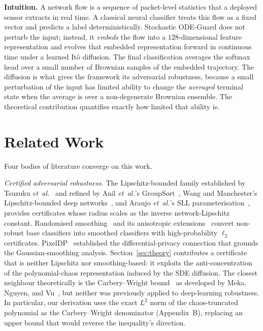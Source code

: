\documentclass{ieeeaccess}
\begin{document}
\medskip\noindent\textbf{Intuition.} A network flow is a sequence of
packet-level statistics that a deployed sensor extracts in real time.
A classical neural classifier treats this flow as a fixed vector and
predicts a label deterministically. Stochastic ODE-Guard does not
perturb the input; instead, it \emph{embeds} the flow into a
$128$-dimensional feature representation and evolves that embedded
representation forward in continuous time under a learned It\^o
diffusion. The final classification averages the softmax head over a
small number of Brownian samples of the embedded trajectory. The
diffusion is what gives the framework its adversarial robustness,
because a small perturbation of the input has limited ability to
change the \emph{averaged} terminal state when the average is over a
non-degenerate Brownian ensemble. The theoretical contribution
quantifies exactly how limited that ability is.

\section{Related Work}\label{sec:related}
Four bodies of literature converge on this work.

\emph{Certified adversarial robustness.} The Lipschitz-bounded family
established by Tsuzuku \textit{et~al.}~\cite{tsuzuku2018lipschitz}
and refined by Anil \textit{et~al.}'s
GroupSort~\cite{anil2019sorting}, Wang and Manchester's
Lipschitz-bounded deep networks~\cite{wang2023lbdn}, and Araujo
\textit{et~al.}'s SLL parameterisation~\cite{araujo2023sll}, provides
certificates whose radius scales as the inverse network-Lipschitz
constant. Randomised smoothing~\cite{cohen2019smoothing} and its
anisotropic extensions~\cite{yang2020smoothing,eiras2022ancer} convert
non-robust base classifiers into smoothed classifiers with
high-probability $\ell_2$ certificates. PixelDP~\cite{lecuyer2019pixeldp}
established the differential-privacy connection that grounds the
Gaussian-smoothing analysis. Section~\ref{sec:theory} contributes a
certificate that is neither Lipschitz nor smoothing-based: it exploits
the anti-concentration of the polynomial-chaos representation induced
by the SDE diffusion. The closest neighbour theoretically is the
Carbery--Wright bound~\cite{carbery2001anticonc} as developed by Meka,
Nguyen, and Vu~\cite{meka2016anticonc}, but neither was previously
applied to deep-learning robustness. In particular, our derivation
uses the exact $L^{2}$ norm of the chaos-truncated polynomial as the
Carbery--Wright denominator (Appendix~B), replacing an upper bound
that would reverse the inequality's direction.
\end{document}
